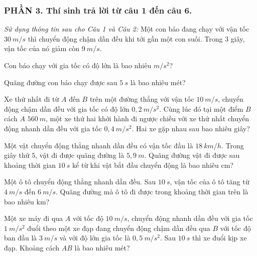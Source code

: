 

























\subsubsection*{PHẦN 3. Thí sinh trả lời từ câu 1 đến câu 6.}
\setcounter{ex}{0}
\textit{Sử dụng thông tin sau cho Câu 1 và Câu 2:} Một con báo đang chạy với vận tốc $30\ m/s$ thì chuyển động chậm dần đều khi tới gần một con suối. Trong $3$ giây, vận tốc của nó giảm còn $9\ m/s$.
\begin{ex}%
Con báo chạy với gia tốc có độ lớn là bao nhiêu $m/s^2$?
\loigiai{}
\end{ex}
\begin{ex}%
Quãng đường con báo chạy được sau $5\ s$ là bao nhiêu mét?
\loigiai{}
\end{ex}
\begin{ex}%
Xe thứ nhất đi từ $A$ đến $B$ trên một đường thẳng với vận tốc $10\ m/s$, chuyển động chậm dần đều với gia tốc có độ lớn $0,2\ m/s^2$. Cùng lúc đó tại một điểm $B$ cách $A$ $560\ m$, một xe thứ hai khởi hành đi ngược chiều với xe thứ nhất chuyển động nhanh dần đều với gia tốc $0,4\ m/s^2$. Hai xe gặp nhau sau bao nhiêu giây?
\loigiai{}
\end{ex}
\begin{ex}%
Một vật chuyển động thẳng nhanh dần đều có vận tốc đầu là $18\ km/h$. Trong giây thứ $5$, vật đi được quãng đường là $5,9\ m$. Quãng đường vật đi được sau khoảng thời gian $10\ s$ kể từ khi vật bắt đầu chuyển động là bao nhiêu cm?
\loigiai{
}
\end{ex}
\begin{ex}%
Một ô tô chuyển động thẳng nhanh dần đều. Sau $10\ s$, vận tốc của ô tô tăng từ $4\ m/s$ đến $6\ m/s$. Quãng đường mà ô tô đi được trong khoảng thời gian trên là bao nhiêu km?
\loigiai{
}
\end{ex}
\begin{ex}%
Một xe máy đi qua $A$ với tốc độ $10\ m/s$, chuyển động nhanh dần đều với gia tốc $1\ m/s^2$ đuổi theo một xe đạp đang chuyển động chậm dần đều qua $B$ với tốc độ ban đầu là $3\ m/s$ và với độ lớn gia tốc là $0,5\ m/s^2$. Sau $10\ s$ thì xe đuổi kịp xe đạp. Khoảng cách $AB$ là bao nhiêu mét?
\loigiai{}
\end{ex}
